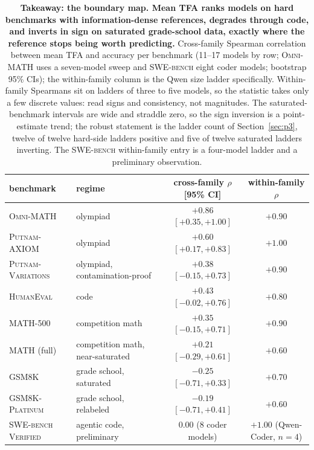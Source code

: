 \documentclass[11pt]{article}
\newcommand{\tfa}{\textsc{TFA}}
\begin{document}
\begin{table}[t!]
\centering
\footnotesize
\setlength{\tabcolsep}{2.5pt}
\begin{tabular}{llcc}
\toprule
benchmark & regime & cross-family $\rho$ [95\% CI] & within-family $\rho$ \\
\midrule
\textsc{Omni-MATH} & olympiad & $\mathbf{+0.86}$ $[+0.35, +1.00]$ & $+0.90$ \\
\textsc{Putnam-AXIOM} & olympiad & $+0.60$ $[+0.17, +0.83]$ & $\mathbf{+1.00}$ \\
\textsc{Putnam-Variations} & olympiad, contamination-proof & $+0.38$ $[-0.15, +0.73]$ & $+0.90$ \\
\textsc{HumanEval} & code & $+0.43$ $[-0.02, +0.76]$ & $+0.80$ \\
\textsc{MATH-500} & competition math & $+0.35$ $[-0.15, +0.71]$ & $+0.90$ \\
\textsc{MATH} (full) & competition math, near-saturated & $+0.21$ $[-0.29, +0.61]$ & $+0.60$ \\
\textsc{GSM8K} & grade school, saturated & $-0.25$ $[-0.71, +0.33]$ & $+0.70$ \\
\textsc{GSM8K-Platinum} & grade school, relabeled & $-0.19$ $[-0.71, +0.41]$ & $+0.60$ \\
\textsc{SWE-bench Verified} & agentic code, preliminary & $0.00$ (8 coder models) & $+1.00$ (Qwen-Coder, $n{=}4$) \\
\bottomrule
\end{tabular}
\caption{\textbf{Takeaway: the boundary map. Mean \tfa{} ranks models on hard benchmarks with information-dense references, degrades through code, and inverts in sign on saturated grade-school data, exactly where the reference stops being worth predicting.}
Cross-family Spearman correlation between mean \tfa{} and accuracy per benchmark (11--17 models by row; \textsc{Omni-MATH} uses a seven-model sweep and \textsc{SWE-bench} eight coder models; bootstrap 95\% CIs); the within-family column is the Qwen size ladder specifically.
Within-family Spearmans sit on ladders of three to five models, so the statistic takes only a few discrete values: read signs and consistency, not magnitudes.
The saturated-benchmark intervals are wide and straddle zero, so the sign inversion is a point-estimate trend; the robust statement is the ladder count of Section~\ref{sec:p3}, twelve of twelve hard-side ladders positive and five of twelve saturated ladders inverting.
The \textsc{SWE-bench} within-family entry is a four-model ladder and a preliminary observation.}
\label{tab:map}
\end{table}
\end{document}
